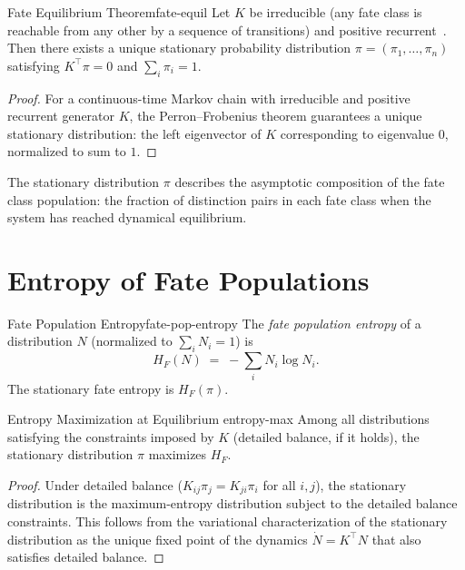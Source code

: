\documentclass[12pt,twoside,openright]{book}
\providecommand{\transRate}{K}
\providecommand{\statDist}{\pi}
\providecommand{\fateEntropy}{H_{F}}
\begin{document}
\begin{theorem}{Fate Equilibrium Theorem}{fate-equil}
Let $\transRate$ be irreducible (any fate class is reachable
from any other by a sequence of transitions) and positive
recurrent~\cite{li2008}. Then there exists a unique stationary probability
distribution $\statDist=(\pi_1,\ldots,\pi_n)$ satisfying
$\transRate^{\top}\statDist=0$ and $\sum_i\pi_i=1$.
\begin{proof}
For a continuous-time Markov chain with irreducible and
positive recurrent generator $\transRate$, the Perron--Frobenius
theorem guarantees a unique stationary distribution: the
left eigenvector of $\transRate$ corresponding to eigenvalue
$0$, normalized to sum to $1$.
\end{proof}
\end{theorem}

The stationary distribution $\statDist$ describes the
asymptotic composition of the fate class population: the
fraction of distinction pairs in each fate class when the
system has reached dynamical equilibrium.

\section{Entropy of Fate Populations}

\begin{definition}{Fate Population Entropy}{fate-pop-entropy}
The \emph{fate population entropy} of a distribution $N$
(normalized to $\sum_i N_i=1$) is
\[
  \fateEntropy(N)
  \;=\;
  -\sum_i N_i\log N_i.
\]
The stationary fate entropy is $\fateEntropy(\statDist)$.
\end{definition}

\begin{theorem}{Entropy Maximization at Equilibrium}%
  {entropy-max}
Among all distributions satisfying the constraints imposed
by $\transRate$ (detailed balance, if it holds), the
stationary distribution $\statDist$ maximizes $\fateEntropy$.
\begin{proof}
Under detailed balance ($K_{ij}\pi_j=K_{ji}\pi_i$ for all
$i,j$), the stationary distribution is the maximum-entropy
distribution subject to the detailed balance constraints.
This follows from the variational characterization of the
stationary distribution as the unique fixed point of the
dynamics $\dot{N}=\transRate^{\top}N$ that also satisfies
detailed balance.
\end{proof}
\end{theorem}
\end{document}
